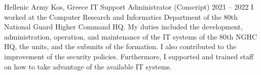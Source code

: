 
\begin{cventries}
    \cventryiv
        {Hellenic Army}
        {Kos, Greece}
        {IT Support Administrator (Conscript)}
        {2021 -- 2022}
    \cventryi
        {I worked at the Computer Research and Informatics Department of the 80th National Guard Higher Command HQ. My duties included the development, administration, operation, and maintenance of the IT systems of the 80th NGHC HQ, the units, and the subunits of the formation. I also contributed to the improvement of the security policies. Furthermore, I supported and trained staff on how to take advantage of the available IT systems.}
\end{cventries}
